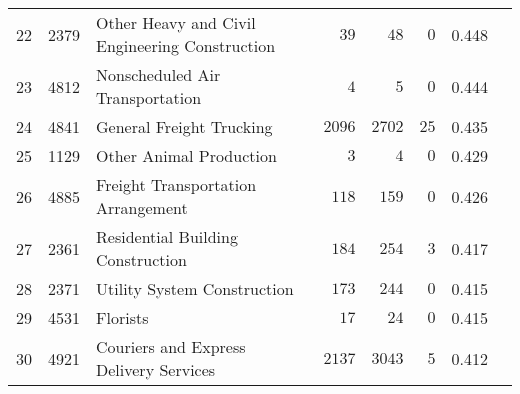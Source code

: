 \documentclass[9pt, oneside]{article}   	%
\begin{document}
\begin{longtable}{lcp{3 in}ccccc}
22  & 2379 & Other Heavy and Civil Engineering Construction & $\phantom{00}39$ & $\phantom{00}48$ & $\phantom{0}0$ & 0.448 \\
23  & 4812 & Nonscheduled Air Transportation & $\phantom{000}4$ & $\phantom{000}5$ & $\phantom{0}0$ & 0.444 \\
24  & 4841 & General Freight Trucking & $2096$ & $2702$ & $25$ & 0.435 \\
25  & 1129 & Other Animal Production & $\phantom{000}3$ & $\phantom{000}4$ & $\phantom{0}0$ & 0.429 \\
26  & 4885 & Freight Transportation Arrangement & $\phantom{0}118$ & $\phantom{0}159$ & $\phantom{0}0$ & 0.426 \\
27  & 2361 & Residential Building Construction & $\phantom{0}184$ & $\phantom{0}254$ & $\phantom{0}3$ & 0.417 \\
28  & 2371 & Utility System Construction & $\phantom{0}173$ & $\phantom{0}244$ & $\phantom{0}0$ & 0.415 \\
29  & 4531 & Florists & $\phantom{00}17$ & $\phantom{00}24$ & $\phantom{0}0$ & 0.415 \\
30  & 4921 & Couriers and Express Delivery Services & $2137$ & $3043$ & $\phantom{0}5$ & 0.412 \\


\end{longtable}
\end{document}
